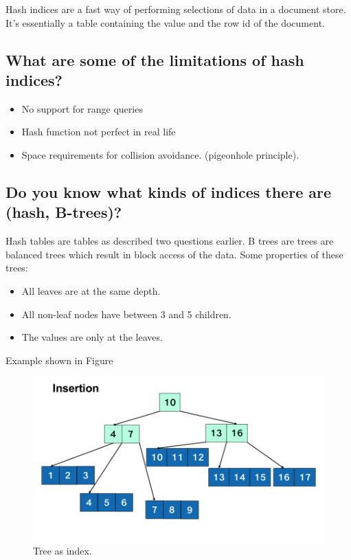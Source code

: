 \documentclass{article}
\begin{document}
Hash indices are a fast way of performing selections of data in a document store. It's essentially a table containing the value and the row id of the document.

\subsection{What are some of the limitations of hash indices?}

\begin{itemize}
\item No support for range queries
\item Hash function not perfect in real life
\item Space requirements for collision avoidance. (pigeonhole principle).
\end{itemize}

\subsection{Do you know what kinds of indices there are (hash, B-trees)?}

Hash tables are tables as described two questions earlier. B trees are trees are balanced trees which result in block access of the data. Some properties of these trees:
\begin{itemize}
\item All leaves are at the same depth.
\item All non-leaf nodes have between 3 and 5 children.
\item The values are only at the leaves.
\end{itemize}

Example shown in Figure

\begin{figure}
  \centering
  \includegraphics[width=.7\textwidth]{img/index_tree.png}
  \caption{Tree as index.}
  \label{fig:tree}
\end{figure}
\end{document}
